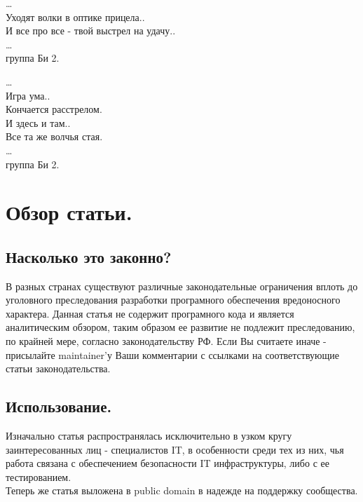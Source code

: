 \begin{flushleft}
\ldots\\
Уходят волки в оптике прицела..\\
И все про все - твой выстрел на удачу..\\
\ldots\\
группа Би 2.\\
\end{flushleft}

\begin{flushright}
\ldots\\
Игра ума.. \\
Кончается расстрелом.\\
И здесь и там..\\
Все та же волчья стая.\\
\ldots\\
группа Би 2.\\
\end{flushright}


\section{Обзор статьи.}
\label{section_paper_overview}

\subsection{Насколько это законно?}
В разных странах существуют различные законодательные ограничения вплоть до уголовного преследования
разработки програмного обеспечения вредоносного характера. Данная статья не содержит програмного кода и
является аналитическим обзором, таким образом ее развитие не подлежит преследованию, по крайней мере,
 согласно законодательству РФ. Если Вы считаете иначе - присылайте maintainer'у
Ваши комментарии с ссылками на соответствующие статьи законодательства. 

\subsection{Использование.}

Изначально статья распространялась исключительно в узком кругу заинтересованных
лиц - специалистов IT, в особенности среди тех из них, чья работа связана с обеспечением
безопасности IT инфраструктуры, либо с ее тестированием.\\

Теперь же статья выложена в public domain в надежде на поддержку сообщества.\\

